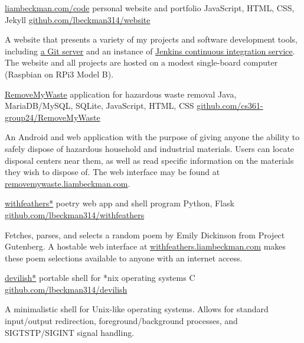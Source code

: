 \medbreak


\showoff
{\href{https://liambeckman.com}{liambeckman.com/code}}
{personal website and portfolio}
{JavaScript, HTML, CSS, Jekyll}
{\href{https://github.com/lbeckman314/website}{github.com/lbeckman314/website}}

A website that presents a variety of my projects and software development tools, including \href{https://git.liambeckman.com}{a Git server} and an instance of \href{https://liambeckman.com/jenkins}{Jenkins continuous integration service}. The website and all projects are hosted on a modest single-board computer (Raspbian on RPi3 Model B).

\myBreak

\showoff
{\href{https://liambeckman.com/code/matriz}{RemoveMyWaste}}
{application for hazardous waste removal}
{Java, MariaDB/MySQL, SQLite, JavaScript, HTML, CSS}
{\href{https://github.com/cs361-group24/RemoveMyWaste}{github.com/cs361-group24/RemoveMyWaste}}

An Android and web application with the purpose of giving anyone the ability to safely dispose of hazardous household and industrial materials. Users can locate disposal centers near them, as well as read specific information on the materials they wish to dispose of. The web interface may be found at \textcolor{my-blue}{\href{https://removemywaste.liambeckman.com}{removemywaste.liambeckman.com}}.

\myBreak

\showoff
{\href{https://withfeathers.liambeckman.com}{withfeathers*}}
{poetry web app and shell program}
{Python, Flask}
{\href{https://github.com/lbeckman314/withfeathers}{github.com/lbeckman314/withfeathers}}

Fetches, parses, and selects a random poem by Emily Dickinson from Project Gutenberg. A hostable web interface at \textcolor{my-blue}{\href{https://withfeathers.liambeckman.com}{withfeathers.liambeckman.com}} makes these poem selections available to anyone with an internet access.

\myBreak

\showoff
{\href{https://liambeckman.com/code/devilish}{devilish*}}
{portable shell for *nix operating systems}
{C}
{\href{https://github.com/lbeckman314/devilish}{github.com/lbeckman314/devilish}}

A minimalistic shell for Unix-like operating systems. Allows for standard input/output redirection, foreground/background processes, and SIGTSTP/SIGINT signal handling.


